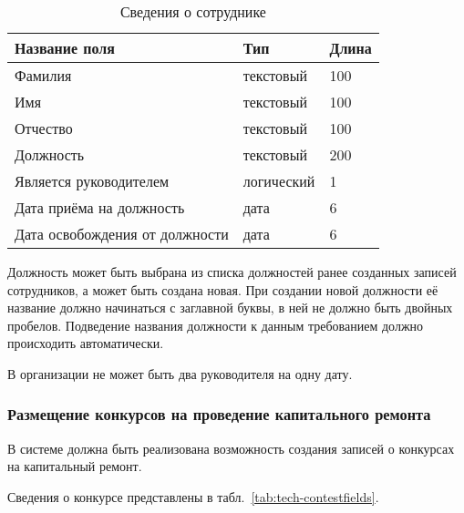 \begin{footnotesize}
\begin{longtable}[h]{|p{}|p{}|p{}|}
	\caption{\label{tab:tech-employeefields}Сведения о сотруднике} \\
	\hline
		\textbf{Название поля} & \textbf{Тип} & \textbf{Длина} \\
	\hline \endhead
		Фамилия & текстовый & 100 \\
	\hline
		Имя & текстовый & 100 \\
	\hline
		Отчество & текстовый & 100 \\
	\hline
		Должность & текстовый & 200 \\
	\hline
		Является руководителем & логический & 1 \\
	\hline
		Дата приёма на должность & дата & 6 \\
	\hline
		Дата освобождения от должности & дата & 6 \\
	\hline
\end{longtable}
\end{footnotesize}

Должность может быть выбрана из списка должностей ранее созданных записей сотрудников, а может быть создана новая.
При создании новой должности её название должно начинаться с заглавной буквы, в ней не должно быть двойных пробелов.
Подведение названия должности к данным требованием должно происходить автоматически.

В организации не может быть два руководителя на одну дату.

\subsubsection{Размещение конкурсов на проведение капитального ремонта}

В системе должна быть реализована возможность создания записей о конкурсах на капитальный ремонт.

Сведения о конкурсе представлены в табл.~\ref{tab:tech-contestfields}.


